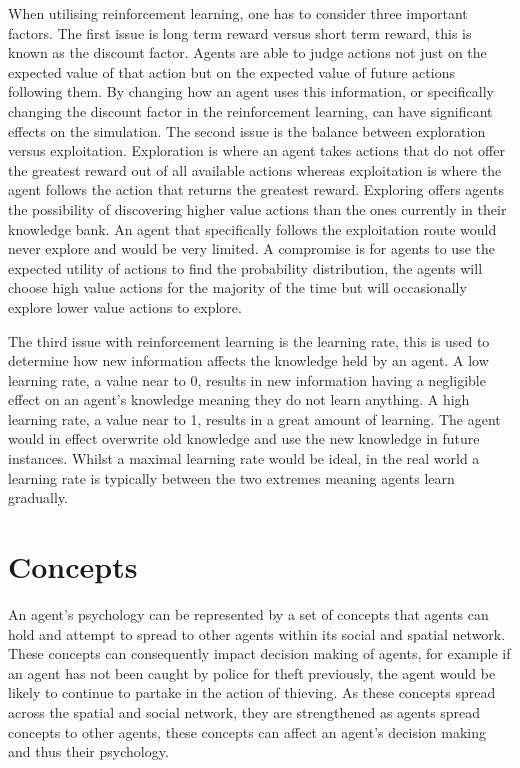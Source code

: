 \documentclass[11pt]{informatics-report}
\begin{document}
When utilising reinforcement learning, one has to consider three important factors. The first issue is long term reward versus short term reward, this is known as the discount factor. Agents are able to judge actions not just on the expected value of that action but on the expected value of future actions following them. By changing how an agent uses this information, or specifically changing the discount factor in the reinforcement learning, can have significant effects on the simulation. The second issue is the balance between exploration versus exploitation. Exploration is where an agent takes actions that do not offer the greatest reward out of all available actions whereas exploitation is where the agent follows the action that returns the greatest reward. Exploring offers agents the possibility of discovering higher value actions than the ones currently in their knowledge bank. An agent that specifically follows the exploitation route would never explore and would be very limited. A compromise is for agents to use the expected utility of actions to find the probability distribution, the agents will choose high value actions for the majority of the time but will occasionally explore lower value actions to explore.

The third issue with reinforcement learning is the learning rate, this is used to determine how new information affects the knowledge held by an agent. A low learning rate, a value near to 0, results in new information having a negligible effect on an agent's knowledge meaning they do not learn anything. A high learning rate, a value near to 1, results in a great amount of learning. The agent would in effect overwrite old knowledge and use the new knowledge in future instances. Whilst a maximal learning rate would be ideal, in the real world a learning rate is typically between the two extremes meaning agents learn gradually. 

\section{Concepts}
An agent's psychology can be represented by a set of concepts that agents can hold and attempt to spread to other agents within its social and spatial network. These concepts can consequently impact decision making of agents, for example if an agent has not been caught by police for theft previously, the agent would be likely to continue to partake in the action of thieving. As these concepts spread across the spatial and social network, they are strengthened as agents spread concepts to other agents, these concepts can affect an agent's decision making and thus their psychology. \par
\end{document}
